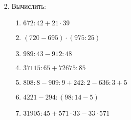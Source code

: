 \documentclass[12pt, a4paper]{article}
\begin{document}
\begin{enumerate}
\begin{multicols}{2}
	\end{multicols}
	\item Вычислить:
	\begin{enumerate}[label=\textbf{\arabic*)}]
		\item \( 672:42+21\cdot39 \)
		\item \( (720-695)\cdot(975:25) \)
		\item \( 989:43-912:48 \)
		\item \( 37115:65+72675:85 \)
		\item \( 808:8-909:9+242:2-636:3+5 \)
		\item \( 4221-294:(98:14-5) \)
		\item \( 31905:45+571\cdot33-33\cdot571 \)
	\end{enumerate}
\end{enumerate}
\end{document}
